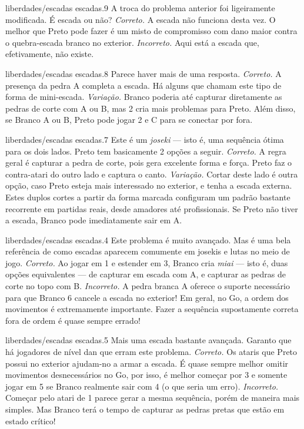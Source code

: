 \problemAnswerDiagram
  {liberdades/escadas}
  {escadas.9}
  {A troca do problema anterior foi ligeiramente modificada. É escada ou não?}
  {\emph{Correto.} A escada não funciona desta vez. O melhor que Preto pode fazer é um misto de compromisso com dano maior contra o quebra-escada branco no exterior.}
  {\emph{Incorreto.} Aqui está a escada que, efetivamente, não existe.}

\problemAnswerDiagram
  {liberdades/escadas}
  {escadas.8}
  {Parece haver mais de uma resposta.}
  {\emph{Correto.} A presença da pedra A completa a escada. Há alguns que chamam este tipo de forma de mini-escada.}
  {\emph{Variação.} Branco poderia até capturar diretamente as pedras de corte com A ou B, mas 2 cria mais problemas para Preto. Além disso, se Branco A ou B, Preto pode jogar 2 e C para se conectar por fora.}

\problemAnswerDiagram
  {liberdades/escadas}
  {escadas.7}
  {Este é um \emph{joseki} --- isto é, uma sequência ótima para os dois lados. Preto tem basicamente 2 opções a seguir.}
  {\emph{Correto.} A regra geral é capturar a pedra de corte, pois gera excelente forma e força. Preto faz o contra-atari do outro lado e captura o canto.}
  {\emph{Variação.} Cortar deste lado é outra opção, caso Preto esteja mais interessado no exterior, e tenha a escada externa. Estes duplos cortes a partir da forma marcada configuram um padrão bastante recorrente em partidas reais, desde amadores até profissionais. Se Preto não tiver a escada, Branco pode imediatamente sair em A.}

\problemAnswerDiagram
  {liberdades/escadas}
  {escadas.4}
  {Este problema é muito avançado. Mas é uma bela referência de como escadas aparecem comumente em josekis e lutas no meio de jogo.}
  {\emph{Correto.} Ao jogar em 1 e estender em 3, Branco cria  \emph{miai} --- isto é, duas opções equivalentes --- de capturar em escada com A, e capturar as pedras de corte no topo com B.}
  {\emph{Incorreto.} A pedra branca A oferece o suporte necessário para que Branco 6 cancele a escada no exterior! Em geral, no Go, a ordem dos movimentos é extremamente importante. Fazer a sequência supostamente correta fora de ordem é quase sempre errado!}

\problemAnswerDiagram
  {liberdades/escadas}
  {escadas.5}
  {Mais uma escada bastante avançada. Garanto que há jogadores de nível dan que erram este problema.}
  {\emph{Correto.} Os ataris que Preto possui no exterior ajudam-no a armar a escada. É quase sempre melhor omitir movimentos desnecessários no Go, por isso, é melhor começar por 3 e somente jogar em 5 se Branco realmente sair com 4 (o que seria um erro).}
  {\emph{Incorreto.} Começar pelo atari de 1 parece gerar a mesma sequência, porém de maneira mais simples. Mas Branco terá o tempo de capturar as pedras pretas que estão em estado crítico!}